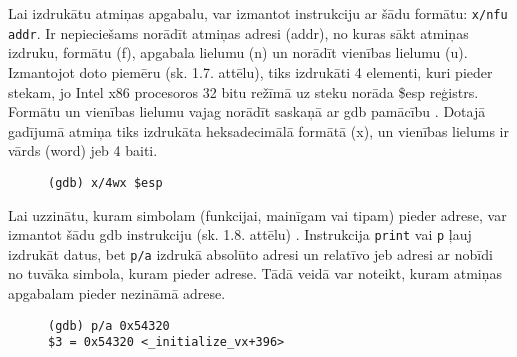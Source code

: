Lai izdrukātu atmiņas apgabalu, var izmantot instrukciju ar šādu formātu: \texttt{x/nfu addr}. 
Ir nepieciešams norādīt atmiņas adresi (addr), no kuras sākt atmiņas izdruku, formātu (f), apgabala lielumu (n) un norādīt vienības lielumu (u). 
Izmantojot doto piemēru (sk. 1.7. attēlu), tiks izdrukāti 4 elementi, kuri pieder stekam, jo Intel x86 procesoros 32 bitu režīmā uz steku norāda \$esp reģistrs. 
Formātu un vienības lielumu vajag norādīt saskaņā ar gdb pamācību \cite{gdb}. 
Dotajā gadījumā atmiņa tiks izdrukāta heksadecimālā formātā (x), un vienības lielums ir vārds (word) jeb 4 baiti.
\begin{figure}[h]
\begin{lstlisting}[style=customgdb]
(gdb) x/4wx $esp
\end{lstlisting}
\caption{\textbf{\fontsize{11}{12}\selectfont {Atmiņas apgabala izdrukāšana}}}
\end{figure}

Lai uzzinātu, kuram simbolam (funkcijai, mainīgam vai tipam) pieder adrese, var izmantot šādu gdb instrukciju (sk. 1.8. attēlu) \cite{gdb}.
Instrukcija \texttt{print} vai \texttt{p} ļauj izdrukāt datus, bet \texttt{p/a} izdrukā absolūto adresi un relatīvo jeb adresi ar nobīdi no tuvāka simbola, kuram pieder adrese.
Tādā veidā var noteikt, kuram atmiņas apgabalam pieder nezināmā adrese.
\begin{figure}[h]
\begin{lstlisting}[style=customgdb]
(gdb) p/a 0x54320
$3 = 0x54320 <_initialize_vx+396>
\end{lstlisting}
\caption{\textbf{\fontsize{11}{12}\selectfont {Noteikšana, kuram simbolam pieder adrese}}}
\end{figure}

